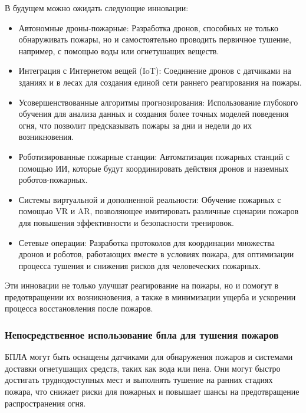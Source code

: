 В будущем можно ожидать следующие инновации:
\begin{itemize}
	\item Автономные дроны-пожарные: Разработка дронов, способных не только обнаруживать пожары, но и самостоятельно проводить первичное тушение, например, с помощью воды или огнетушащих веществ.
	\item Интеграция с Интернетом вещей (IoT): Соединение дронов с датчиками на зданиях и в лесах для создания единой сети раннего реагирования на пожары.
	\item Усовершенствованные алгоритмы прогнозирования: Использование глубокого обучения для анализа данных и создания более точных моделей поведения огня, что позволит предсказывать пожары за дни и недели до их возникновения.
	\item Роботизированные пожарные станции: Автоматизация пожарных станций с помощью ИИ, которые будут координировать действия дронов и наземных роботов-пожарных.
	\item Системы виртуальной и дополненной реальности: Обучение пожарных с помощью VR и AR, позволяющее имитировать различные сценарии пожаров для повышения эффективности и безопасности тренировок.
	\item Сетевые операции: Разработка протоколов для координации множества дронов и роботов, работающих вместе в условиях пожара, для оптимизации процесса тушения и снижения рисков для человеческих пожарных.
\end{itemize}

Эти инновации не только улучшат реагирование на пожары, но и помогут в предотвращении их возникновения, а также в минимизации ущерба и ускорении процесса восстановления после пожаров.
\subsubsection{Непосредственное использование бпла для тушения пожаров}

БПЛА могут быть оснащены датчиками для обнаружения пожаров и системами доставки огнетушащих средств, таких как вода или пена. Они могут быстро достигать труднодоступных мест и выполнять тушение на ранних стадиях пожара, что снижает риски для пожарных и повышает шансы на предотвращение распространения огня.

